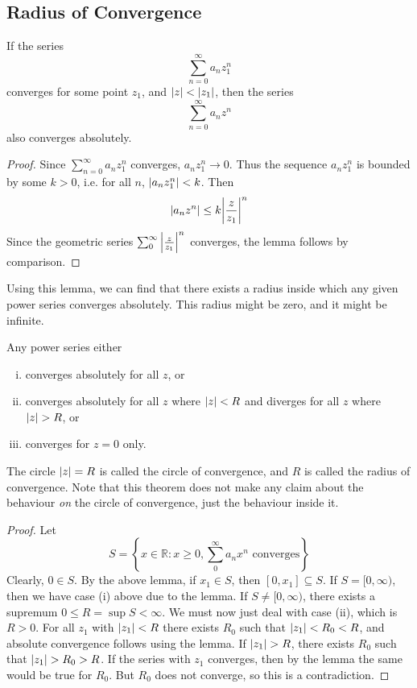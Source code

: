 \documentclass{article}
\begin{document}
\subsection{Radius of Convergence}
\begin{lemma}
	If the series
	\[ \sum_{n=0}^\infty a_n z_1^n \]
	converges for some point $z_1$, and $\abs{z} < \abs{z_1}$, then the series
	\[ \sum_{n=0}^\infty a_n z^n \]
	also converges absolutely.
\end{lemma}
\begin{proof}
	Since $\sum_{n=0}^\infty a_n z_1^n$ converges, $a_n z_1^n \to 0$. Thus the sequence $a_n z_1^n$ is bounded by some $k > 0$, i.e. for all $n$, $\abs{a_n z_1^n}<k$. Then
	\[ \abs{a_n z^n} \leq k\abs{\frac{z}{z_1}}^n \]
	Since the geometric series $\sum_0^\infty \abs{\frac{z}{z_1}}^n$ converges, the lemma follows by comparison.
\end{proof}
\noindent Using this lemma, we can find that there exists a radius inside which any given power series converges absolutely. This radius might be zero, and it might be infinite.
\begin{theorem}
	Any power series either
	\begin{enumerate}[(i)]
		\item converges absolutely for all $z$, or
		\item converges absolutely for all $z$ where $\abs{z} < R$ and diverges for all $z$ where $\abs{z} > R$, or
		\item converges for $z = 0$ only.
	\end{enumerate}
\end{theorem}
\noindent The circle $\abs{z} = R$ is called the circle of convergence, and $R$ is called the radius of convergence. Note that this theorem does not make any claim about the behaviour \textit{on} the circle of convergence, just the behaviour inside it.
\begin{proof}
	Let
	\[ S = \left\{ x \in \mathbb R \colon x \geq 0, \sum_0^\infty a_n x^n \text{ converges} \right\} \]
	Clearly, $0 \in S$. By the above lemma, if $x_1 \in S$, then $[0, x_1] \subseteq S$. If $S = [0, \infty)$, then we have case (i) above due to the lemma. If $S \neq [0, \infty)$, there exists a supremum $0 \leq R = \sup S < \infty$. We must now just deal with case (ii), which is $R > 0$. For all $z_1$ with $\abs{z_1} < R$ there exists $R_0$ such that $\abs{z_1} < R_0 < R$, and absolute convergence follows using the lemma. If $\abs{z_1} > R$, there exists $R_0$ such that $\abs{z_1} > R_0 > R$. If the series with $z_1$ converges, then by the lemma the same would be true for $R_0$. But $R_0$ does not converge, so this is a contradiction.
\end{proof}
\end{document}
